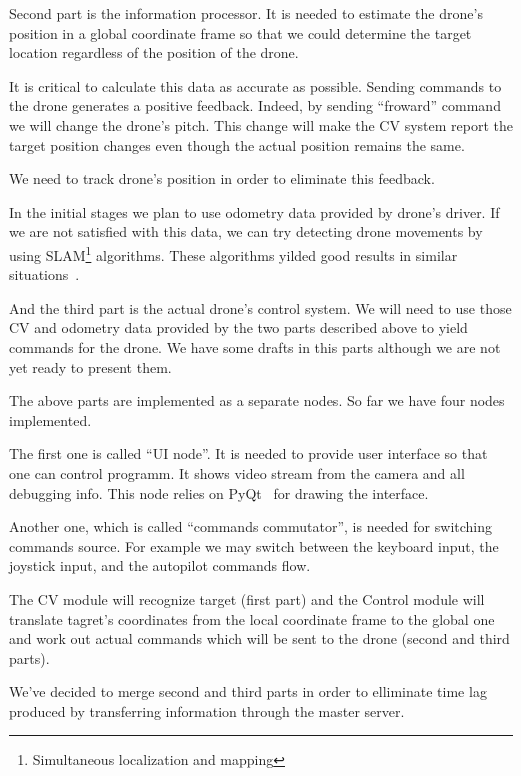 \documentclass[11pt]{article}
\begin{document}
    Second part is the information processor. It is needed to estimate the
    drone's position in a global coordinate frame so that we could determine
    the target location regardless of the position of the drone.

    It is critical to calculate this data as accurate as possible.
    Sending commands to the drone generates a positive feedback.
    Indeed, by sending ``froward'' command we will
    change the drone's pitch. This change will make the CV system report
    the target position changes even though the actual position
    remains the same.

    We need to track drone's position in order to eliminate this feedback.

    In the initial stages we plan to use odometry data provided by drone's
    driver. If we are not satisfied with this data, we can try detecting
    drone movements by using SLAM\footnote{Simultaneous
    localization and mapping} algorithms. These algorithms yilded
    good results in similar situations~\cite{PATM, PATMonline}.

    And the third part is the actual drone's control system.
    We will need to use those CV and odometry data provided by the two parts
    described above to yield commands for the drone.
    We have some drafts in this parts although we are not yet ready to
    present them.

    The above parts are implemented as a separate nodes.
    So far we have four nodes implemented.

    The first one is called ``UI node''. It is needed to provide user interface
    so that one can control programm.
    It shows video stream from the camera and all debugging info.
    This node relies on PyQt~\cite{PyQt} for drawing the interface.

    Another one, which is called ``commands commutator'',
    is needed for switching commands source.
    For example we may switch between the keyboard input, the joystick input, 
    and the autopilot commands flow.

    The CV module will recognize target (first part) and the Control module will
    translate tagret's coordinates from the local coordinate frame to the
    global one and work out actual commands which will be sent to the drone
    (second and third parts).

    We've decided to merge second and third parts in order to elliminate
    time lag produced by transferring information through the master server.
\end{document}
